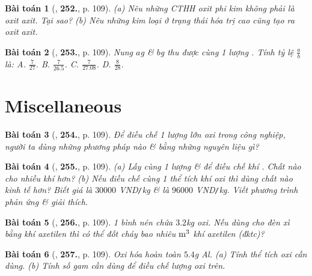 \documentclass{article}
\numberwithin{equation}{section}
\newtheorem{baitoan}{Bài toán}
\begin{document}
\begin{baitoan}[\cite{An_400_BT_Hoa_Hoc_8_2020}, \textbf{252.}, p. 109]
	(a) Nêu những CTHH oxit phi kim không phải là oxit axit. Tại sao? (b) Nêu những kim loại ở trạng thái hóa trị cao cũng tạo ra oxit axit.
\end{baitoan}

\begin{baitoan}[\cite{An_400_BT_Hoa_Hoc_8_2020}, \textbf{253.}, p. 109]
	Nung $a$\emph{g} \emph{} \& $b$\emph{g} \emph{} thu được cùng 1 lượng \emph{}. Tính tỷ lệ $\frac{a}{b}$ là: {\sf A.} $\frac{7}{27}$. {\sf B.} $\frac{7}{26.5}$. {\sf C.} $\frac{7}{27.08}$. {\sf D.} $\frac{8}{28}$.
\end{baitoan}


\section{Miscellaneous}

\begin{baitoan}[\cite{An_400_BT_Hoa_Hoc_8_2020}, \textbf{254.}, p. 109]
	Để điều chế 1 lượng lớn oxi trong công nghiệp, người ta dùng những phương pháp nào \& bằng những nguyên liệu gì?
\end{baitoan}

\begin{baitoan}[\cite{An_400_BT_Hoa_Hoc_8_2020}, \textbf{255.}, p. 109]
	(a) Lấy cùng 1 lượng \emph{} \& \emph{} để điều chế khí \emph{}. Chất nào cho nhiều khí \emph{} hơn? (b) Nếu điều chế cùng 1 thể tích khí oxi thì dùng chất nào kinh tế hơn? Biết giá \emph{} là $30000$ \emph{VND\texttt{/}kg} \& \emph{} là $96000$ \emph{VND\texttt{/}kg}. Viết phương trình phản ứng \& giải thích.
\end{baitoan}

\begin{baitoan}[\cite{An_400_BT_Hoa_Hoc_8_2020}, \textbf{256.}, p. 109]
	1 bình nén chứa $3.2$\emph{kg} oxi. Nếu dùng cho đèn xì bằng khí axetilen thì có thể đốt cháy bao nhiêu $\rm m^3$ khí axetilen (đktc)?
\end{baitoan}

\begin{baitoan}[\cite{An_400_BT_Hoa_Hoc_8_2020}, \textbf{257.}, p. 109]
	Oxi hóa hoàn toàn $5.4$\emph{g Al}. (a) Tính thể tích oxi cần dùng. (b) Tính số gam \emph{} cần dùng để điều chế lượng oxi trên.
\end{baitoan}
\end{document}
